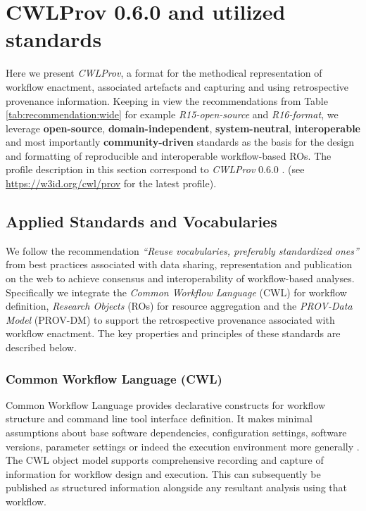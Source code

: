 \documentclass[a4paper,num-refs]{oup-contemporary}
\begin{document}
\section{CWLProv 0.6.0 and utilized standards}\label{sec:CWLProv}
Here we present \textit{CWLProv}, a format for the methodical representation of workflow enactment, associated artefacts and capturing and using retrospective provenance information. Keeping in view the recommendations from Table \ref{tab:recommendation:wide} for example \textit{R15-open-source} and \textit{R16-format}, we leverage \textbf{open-source}, \textbf{domain-independent}, \textbf{system-neutral}, \textbf{interoperable} and most importantly \textbf{community-driven} standards as the basis for the design and formatting of reproducible and interoperable workflow-based ROs. The profile description in this section correspond to \textit{CWLProv} 0.6.0 \citep{cwlprov}. (see \url{https://w3id.org/cwl/prov} for the latest profile).

\subsection{Applied Standards and Vocabularies} \label{sec:standards}
We follow the recommendation \textit{``Reuse vocabularies, preferably standardized ones''} \citep{reusevocab} from best practices associated with data sharing, representation and publication on the web to achieve consensus and interoperability of workflow-based analyses. Specifically we integrate the \emph{Common Workflow Language} (CWL) for workflow definition, \emph{Research Objects} (ROs) for resource aggregation and the \emph{PROV-Data Model} (PROV-DM) to support the retrospective provenance associated with workflow enactment. The key properties and principles of these standards are described below. 

\subsubsection{\textcolor{black}Common Workflow Language (CWL)}
Common Workflow Language \citep{cwl} provides declarative constructs for workflow structure and command line tool interface definition. It makes minimal assumptions about base software dependencies, configuration settings, software versions, parameter settings or indeed the execution environment more generally \citep{kanwal_2017}. The CWL object model supports comprehensive recording and capture of information for workflow design and execution. This can subsequently be  published as structured information alongside any resultant analysis using that workflow. 
\end{document}
